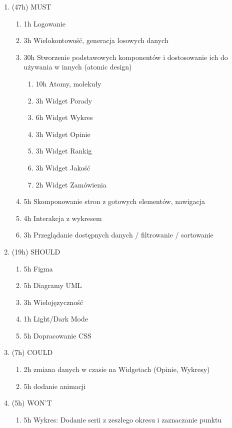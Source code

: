 \documentclass[a4paper,11pt]{article}
\begin{document}
\begin{enumerate}
    \item (47h) MUST
    \begin{enumerate}
        \item 1h Logowanie
        \item 3h Wielokontowość, generacja losowych danych
        \item 30h Stworzenie podstawowych komponentów i dostosowanie ich do używania w innych (atomic design) 
        \begin{enumerate}
            \item 10h Atomy, molekuły
            \item 3h Widget Porady
            \item 6h Widget Wykres
            \item 3h Widget Opinie
            \item 3h Widget Rankig
            \item 3h Widget Jakość
            \item 2h Widget Zamówienia
        \end{enumerate}
        \item 5h Skomponowanie stron z gotowych elementów, nawigacja
        \item 4h Interakcja z wykresem
        \item 3h Przeglądanie dostępnych danych / filtrowanie / sortowanie
    \end{enumerate}
    \item (19h) SHOULD
    \begin{enumerate}
        \item 5h Figma
        \item 5h Diagramy UML
        \item 3h Wielojęzyczność
        \item 1h Light/Dark Mode
        \item 5h Dopracowanie CSS
    \end{enumerate}
    \item (7h) COULD
    \begin{enumerate}
        \item 2h zmiana danych w czasie na Widgetach (Opinie, Wykresy)
        \item 5h dodanie animacji
    \end{enumerate}
    \item (5h) WON'T
    \begin{enumerate}
        \item 5h Wykres: Dodanie serii z zeszłego okresu i zaznaczanie punktu
        
    \end{enumerate}
\end{enumerate}
\end{document}
